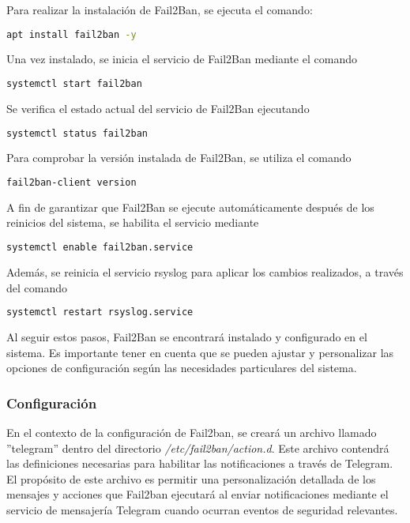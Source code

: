 				Para realizar la instalación de Fail2Ban, se ejecuta el comando:\par
				\begin{lstlisting}[language=Bash, caption=Install]
				apt install fail2ban -y
				\end{lstlisting}
				Una vez instalado, se inicia el servicio de Fail2Ban mediante el comando 
				\begin{lstlisting}[language=Bash, caption=iniciar servicio]
				systemctl start fail2ban
				\end{lstlisting}
				Se verifica el estado actual del servicio de Fail2Ban ejecutando 
				\begin{lstlisting}[language=Bash, caption=Ver estado del servicio]
				systemctl status fail2ban
				\end{lstlisting}
				Para comprobar la versión instalada de Fail2Ban, se utiliza el comando 
				\begin{lstlisting}[language=Bash, caption=Comprobar version]
				fail2ban-client version
				\end{lstlisting}
				A fin de garantizar que Fail2Ban se ejecute automáticamente después de los reinicios del sistema, se habilita el servicio mediante 
				\begin{lstlisting}[language=Bash, caption=habilitar servicio]
				systemctl enable fail2ban.service
				\end{lstlisting}
				Además, se reinicia el servicio rsyslog para aplicar los cambios realizados, a través del comando 
				\begin{lstlisting}[language=Bash, caption=Reiniciar rsyslog]
				systemctl restart rsyslog.service
				\end{lstlisting}

			Al seguir estos pasos, Fail2Ban se encontrará instalado y configurado en el sistema. Es importante tener en cuenta que se pueden ajustar y personalizar las opciones de configuración según las necesidades particulares del sistema.\par
			
		\subsubsection{Configuración}
			
			En el contexto de la configuración de Fail2ban, se creará un archivo llamado ''telegram'' dentro del directorio \textit{/etc/fail2ban/action.d}. Este archivo contendrá las definiciones necesarias para habilitar las notificaciones a través de Telegram. El propósito de este archivo es permitir una personalización detallada de los mensajes y acciones que Fail2ban ejecutará al enviar notificaciones mediante el servicio de mensajería Telegram cuando ocurran eventos de seguridad relevantes.
			
